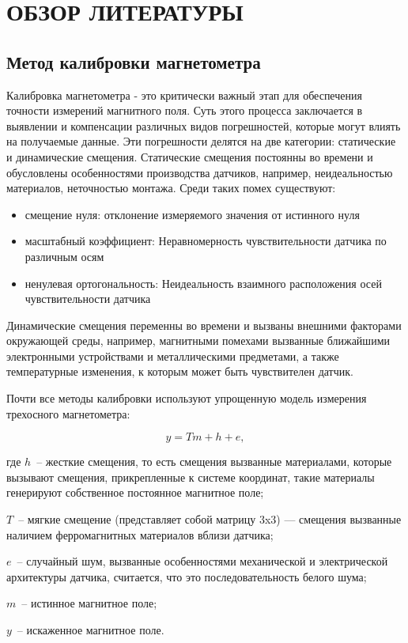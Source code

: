 \section{ОБЗОР ЛИТЕРАТУРЫ}
\label{sec:domain}

\subsection{Метод калибровки магнетометра}
Калибровка магнетометра - это критически важный этап для обеспечения точности измерений магнитного поля. 
Суть этого процесса заключается в выявлении и компенсации различных видов погрешностей, которые могут 
влиять на получаемые данные. Эти погрешности делятся на две категории: статические и динамические смещения.
Статические смещения постоянны во времени и обусловлены особенностями производства датчиков, например,
неидеальностью материалов, неточностью монтажа. Среди таких помех существуют: 
\begin{itemize}
    \item смещение нуля: отклонение измеряемого значения от истинного нуля
    \item масштабный коэффициент: Неравномерность чувствительности датчика по различным осям
    \item ненулевая ортогональность: Неидеальность взаимного расположения осей чувствительности датчика
\end{itemize}

Динамические смещения переменны во времени и вызваны внешними факторами окружающей среды, например, магнитными помехами
вызванные ближайшими электронными устройствами и металлическими предметами, 
а также температурные изменения, к которым может быть чувствителен датчик.

Почти все методы калибровки используют упрощенную модель измерения трехосного магнетометра:

\begin{equation}
    \label{eq:domain:magnetModel}
    y = Tm+h+e,
  \end{equation}
  \begin{explanationx}
    \item[где] $h$~-- жесткие смещения, то есть смещения вызванные материалами, которые вызывают смещения, прикрепленные к системе координат, такие материалы генерируют собственное  постоянное магнитное поле;
    \item      $T$~-- мягкие смещение (представляет собой матрицу 3x3) --- смещения вызванные наличием ферромагнитных материалов вблизи датчика;
    \item      $e$~-- случайный шум, вызванные особенностями механической и электрической архитектуры датчика, считается, что это последовательность белого шума;
    \item      $m$~-- истинное магнитное поле;
    \item      $y$~-- искаженное магнитное поле.
  \end{explanationx}

